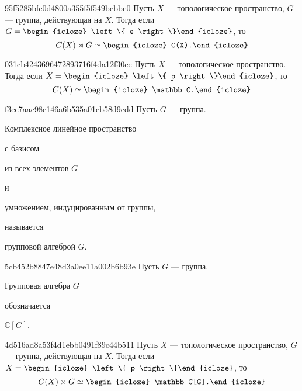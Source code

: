 \begin{note}{95f5285bfc0d4800a355f5f549bcbbe0}
    Пусть \({ X }\) --- топологическое пространство, \({ G }\) --- группа, действующая на \({ X }\).
    Тогда если \({ G = \begin{icloze}{2}\left\{ e \right\}\end{icloze} }\), то
    \[
        C(X) \rtimes G \simeq \begin{icloze}{1}C(X).\end{icloze}
    \]
\end{note}

\begin{note}{031cb4243696472893716f4da12f30ce}
    Пусть \({ X }\) --- топологическое пространство.
    Тогда если \({ X = \begin{icloze}{2}\left\{ p \right\}\end{icloze} }\), то
    \[
        C(X) \simeq \begin{icloze}{1}\mathbb C.\end{icloze}
    \]
\end{note}

\begin{note}{f3ee7aac98c146a6b535a01cb58d9cdd}
    Пусть \({ G }\) --- группа.
    \begin{icloze}{1}Комплексное линейное пространство\end{icloze} с базисом \begin{icloze}{2}из всех элементов \({ G }\)\end{icloze} и \begin{icloze}{3}умножением, индуцированным от группы,\end{icloze} называется \begin{icloze}{4}групповой алгеброй \({ G }\).\end{icloze}
\end{note}

\begin{note}{5cb452b8847e48d3a0ee11a002b6b93e}
    Пусть \({ G }\) --- группа.
    \begin{icloze}{2}Групповая алгебра \({ G }\)\end{icloze} обозначается \begin{icloze}{1}\({ \mathbb C[G] }\).\end{icloze}
\end{note}

\begin{note}{4d516ad8a53f4d1ebb0491f89c44b511}
    Пусть \({ X }\) --- топологическое пространство, \({ G }\) --- группа, действующая на \({ X }\).
    Тогда если \({ X = \begin{icloze}{2}\left\{ p \right\}\end{icloze} }\), то
    \[
        C(X) \rtimes G \simeq \begin{icloze}{1}\mathbb C[G].\end{icloze}
    \]
\end{note}


